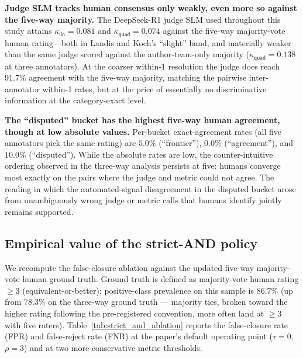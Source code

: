 \textbf{Judge SLM tracks human consensus only weakly, even more so
against the five-way majority.} The DeepSeek-R1 judge SLM used
throughout this study attains
$\kappa_{\textsf{lin}} = 0.081$ and $\kappa_{\textsf{quad}} = 0.074$
against the five-way majority-vote human rating---both in Landis and
Koch's ``slight'' band, and materially weaker than the same judge
scored against the author-team-only majority
($\kappa_{\textsf{quad}} = 0.138$ at three annotators). At the coarser
within-1 resolution the judge does reach $91.7\%$ agreement with the
five-way majority, matching the pairwise inter-annotator within-1 rates,
but at the price of essentially no discriminative information at the
category-exact level.

\textbf{The ``disputed'' bucket has the highest five-way human
agreement, though at low absolute values.} Per-bucket exact-agreement
rates (all five annotators pick the same rating) are $5.0\%$
(``frontier''), $0.0\%$ (``agreement''), and $10.0\%$ (``disputed'').
While the absolute rates are low, the counter-intuitive ordering
observed in the three-way analysis persists at five: humans converge
most exactly on the pairs where the judge and metric could not agree.
The reading in which the automated-signal disagreement in the disputed
bucket arose from unambiguously wrong judge or metric calls that humans
identify jointly remains supported.

\subsection{Empirical value of the strict-AND policy}
\label{sec:human_eval_strict_and}

We recompute the false-closure ablation against the updated five-way
majority-vote human ground truth. Ground truth is defined as
majority-vote human rating $\geq 3$ (equivalent-or-better); positive-class
prevalence on this sample is $86.7\%$ (up from $78.3\%$ on the
three-way ground truth --- majority ties, broken toward the higher
rating following the pre-registered convention, more often land at
$\geq 3$ with five raters).
Table~\ref{tab:strict_and_ablation} reports the false-closure rate (FPR)
and false-reject rate (FNR) at the paper's default operating point
($\tau = 0$, $\rho = 3$) and at two more conservative metric thresholds.

